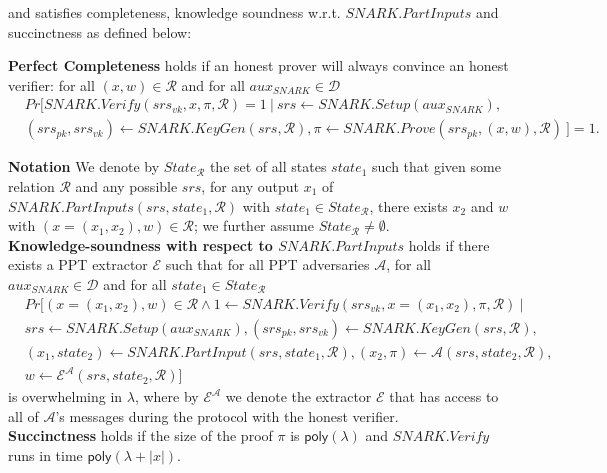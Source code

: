 \begin{definition}
\begin{itemize}
\end{itemize}
and satisfies completeness, knowledge soundness w.r.t. $\mathit{SNARK.PartInputs}$ and succinctness as defined below:

\noindent \textbf{Perfect Completeness} holds if an honest prover will always convince an honest verifier: for all  
$(x,w) \in \mathcal{R}$ and for all $\mathit{aux_{\mathit{SNARK}}} \in \mathcal{D}$
\begin{align*}
& \mathit{Pr}[\mathit{SNARK.Verify}(\mathit{srs_{vk}}, x, \pi, \mathcal{R}) = 1 \ | \  
\mathit{srs} \leftarrow \mathit{SNARK.Setup}(\mathit{aux_{\mathit{SNARK}}}), \\ 
& (\mathit{srs_{pk}}, \mathit{srs_{vk}})\leftarrow \mathit{SNARK.KeyGen}(\mathit{srs}, \mathcal{R}), \pi \leftarrow \mathit{SNARK.Prove}(\mathit{srs_{pk}}, (x,w), \mathcal{R}) \ ] = 1.
\end{align*}

\noindent \textbf{Notation} We denote by $\mathit{State_{\mathcal{R}}}$ the set of all states $\mathit{state}_1$ 
such that given some relation $\mathcal{R}$ and any possible $\mathit{srs}$, 
for any output $x_1$ of \\ $\mathit{SNARK.PartInputs}(\mathit{srs}, \mathit{state}_1, \mathcal{R})$ 
with $\mathit{state_1} \in \mathit{State_{\mathcal{R}}}$, there exists $x_2$ and $w$ with $(x=(x_1, x_2), w) \in \mathcal{R}$; 
we further assume $\mathit{State_{\mathcal{R}}} \neq \emptyset$.\\

\noindent \textbf{Knowledge-soundness with respect to $\mathit{SNARK.PartInputs}$}
holds if there exists a PPT extractor $\mathcal{E}$ such that for all PPT 
adversaries $\mathcal{A}$, for all $\mathit{aux_{\mathit{SNARK}}} \in \mathcal{D}$ and for all $\mathit{state_1} \in \mathit{State_{\mathcal{R}}}$
\begin{align*}
&\mathit{Pr}[(x = (x_1, x_2), w) \in \mathcal{R} \wedge 1 \leftarrow \mathit{SNARK.Verify}(\mathit{srs_{vk}}, x = (x_1, x_2), \pi, \mathcal{R}) \ | \\
&\mathit{srs} \leftarrow \mathit{SNARK.Setup}(\mathit{aux_{\mathit{SNARK}}}), (\mathit{srs_{pk}}, \mathit{srs_{vk}})\leftarrow \mathit{SNARK.KeyGen}(\mathit{srs}, \mathcal{R}), \\ 
& (x_1, \mathit{state}_2) \leftarrow \mathit{SNARK.PartInput}(\mathit{srs}, \mathit{state}_1, \mathcal{R}), (x_2, \pi) \leftarrow \mathcal{A}(\mathit{srs}, \mathit{state}_2, \mathcal{R}), \\
& w \leftarrow \mathcal{E}^{\mathcal{A}}(srs,\mathit{state_2}, \mathcal{R})]
\end{align*}
\noindent is overwhelming in $\lambda$, where by $\mathcal{E}^{\mathcal{A}}$ we denote the extractor $\mathcal{E}$ that has access to all of 
$\mathcal{A}$'s messages during the protocol with the honest verifier.  \\

\noindent \textbf{Succinctness} holds if the size of the proof $\pi$ is $\mathsf{poly}(\lambda)$ and $\mathit{SNARK.Verify}$ runs in time 
$\mathsf{poly}(\lambda + |x|)$. %
\end{definition}

